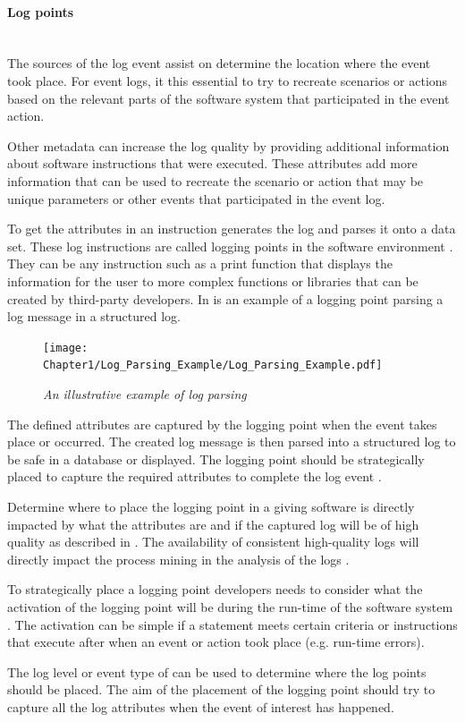 \paragraph{Log points}\leavevmode\\
The sources of the log event assist on determine the location where the event took place. For event logs, it this essential to try to recreate scenarios or actions based on the relevant parts of the software system that participated in the event action.\par Other metadata can increase the log quality by providing additional information about software instructions that were executed. These attributes add more information that can be used to recreate the scenario or action that may be unique parameters or other events that participated in the event log.\par To get the attributes in  an instruction generates the log and parses it onto a data set. These log instructions are called logging points in the software environment \cite{Pecchia2015, Zhu2015}. They can be any instruction such as a print function that displays the information for the user to more complex functions or libraries that can be created by third-party developers. In  is an example of a logging point parsing a log message in a structured log. 

\begin{figure}[!htb]
	\centering %
	\texttt{[image: Chapter1/Log\_Parsing\_Example/Log\_Parsing\_Example.pdf]}
	\caption[An illustrative example of log parsing]
	{\textit{An illustrative example of log parsing \cite{Zhu2019}}} \label{fig:ch1_logParsing}
\end{figure}

The defined attributes are captured by the logging point when the event takes place or occurred. The created log message is then parsed into a structured log to be safe in a database or displayed. The logging point should be strategically placed to capture the required attributes to complete the log event \cite{Fedaghi2010}.\par Determine where to place the logging point in a giving software is directly impacted by what the attributes are and if the captured log will be of high quality as described in . The availability of consistent high-quality logs will directly impact the process mining in the analysis of the logs \cite{Kherbouche2017}.\par To strategically place a logging point developers needs to consider what the activation of the logging point will be during the run-time of the software system \cite{Pecchia2015, Cinque2013}. The activation can be simple if a statement meets certain criteria or instructions that execute after when an event or action took place (e.g. run-time errors). \par The log level or event type of  can be used to determine where the log points should be placed. The aim of the placement of the logging point should try to capture all the log attributes when the event of interest has happened.

